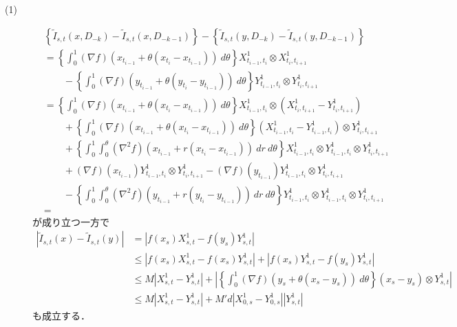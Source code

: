 	\begin{prf}\mbox{}
		\begin{description}
			\item[(1)] 
				\begin{align}
					&\left\{ \tilde{I}_{s,t}(x,D_{-k}) - \tilde{I}_{s,t}(x,D_{-k-1}) \right\}
					- \left\{ \tilde{I}_{s,t}(y,D_{-k}) - \tilde{I}_{s,t}(y,D_{-k-1}) \right\} \\
					&= \left\{ \int_0^1 (\nabla f)(x_{t_{i-1}} + \theta (x_{t_i} - x_{t_{i-1}}))\ d\theta \right\} X^1_{t_{i-1},t_i} \otimes X^1_{t_i,t_{i+1}} \\
						&\qquad - \left\{ \int_0^1 (\nabla f)(y_{t_{i-1}} + \theta (y_{t_i} - y_{t_{i-1}}))\ d\theta \right\} Y^1_{t_{i-1},t_i} \otimes Y^1_{t_i,t_{i+1}} \\
					&= \left\{ \int_0^1 (\nabla f)(x_{t_{i-1}} + \theta (x_{t_i} - x_{t_{i-1}}))\ d\theta \right\} X^1_{t_{i-1},t_i} \otimes \left( X^1_{t_i,t_{i+1}} -  Y^1_{t_i,t_{i+1}}\right) \\
						&\qquad + \left\{ \int_0^1 (\nabla f)(x_{t_{i-1}} + \theta (x_{t_i} - x_{t_{i-1}}))\ d\theta \right\} \left( X^1_{t_{i-1},t_i} - Y^1_{t_{i-1},t_i} \right) \otimes Y^1_{t_i,t_{i+1}} \\
						&\qquad + \left\{ \int_0^1 \int_0^\theta (\nabla^2 f)\left( x_{t_{i-1}} + r(x_{t_i} - x_{t_{i-1}})\right)\ dr\ d\theta \right\} X^1_{t_{i-1},t_i} \otimes Y^1_{t_{i-1},t_i} \otimes Y^1_{t_i,t_{i+1}} \\
						&\qquad + (\nabla f)(x_{t_{i-1}})Y^1_{t_{i-1},t_i} \otimes Y^1_{t_i,t_{i+1}}
							- (\nabla f)(y_{t_{i-1}})Y^1_{t_{i-1},t_i} \otimes Y^1_{t_i,t_{i+1}} \\
						&\qquad - \left\{ \int_0^1 \int_0^\theta (\nabla^2 f)\left( y_{t_{i-1}} + r(y_{t_i} - y_{t_{i-1}})\right)\ dr\ d\theta \right\} Y^1_{t_{i-1},t_i} \otimes Y^1_{t_{i-1},t_i} \otimes Y^1_{t_i,t_{i+1}} \\
					&= 
				\end{align}
				が成り立つ一方で
				\begin{align}
					\left| \tilde{I}_{s,t}(x) - \tilde{I}_{s,t}(y) \right|
					&= \left| f(x_s)X^1_{s,t} - f(y_s)Y^1_{s,t} \right| \\
					&\leq \left| f(x_s)X^1_{s,t} - f(x_s)Y^1_{s,t} \right|
						+ \left| f(x_s)Y^1_{s,t} - f(y_s)Y^1_{s,t} \right| \\
					&\leq M\left| X^1_{s,t} - Y^1_{s,t} \right|
						+ \left| \left\{ \int_0^1 (\nabla f)(y_s + \theta(x_s - y_s))\ d\theta \right\}
						(x_s - y_s) \otimes Y^1_{s,t} \right| \\
					&\leq M\left| X^1_{s,t} - Y^1_{s,t} \right|
						+ M' d \left| X^1_{0,s} - Y^1_{0,s}\right| \left| Y^1_{s,t} \right|
				\end{align}
				も成立する．
		\end{description}
	\end{prf}